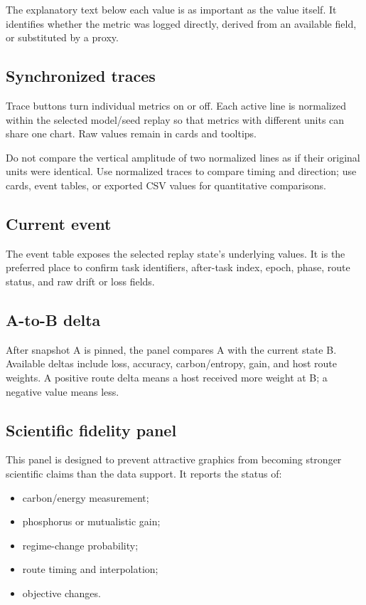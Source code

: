 \documentclass[11pt,a4paper]{article}
\begin{document}
The explanatory text below each value is as important as the value itself. It identifies whether the metric was logged directly, derived from an available field, or substituted by a proxy.

\subsection{Synchronized traces}

Trace buttons turn individual metrics on or off. Each active line is normalized within the selected model/seed replay so that metrics with different units can share one chart. Raw values remain in cards and tooltips.

\begin{warningbox}
Do not compare the vertical amplitude of two normalized lines as if their original units were identical. Use normalized traces to compare timing and direction; use cards, event tables, or exported CSV values for quantitative comparisons.
\end{warningbox}

\subsection{Current event}

The event table exposes the selected replay state's underlying values. It is the preferred place to confirm task identifiers, after-task index, epoch, phase, route status, and raw drift or loss fields.

\subsection{A-to-B delta}

After snapshot A is pinned, the panel compares A with the current state B. Available deltas include loss, accuracy, carbon/entropy, gain, and host route weights. A positive route delta means a host received more weight at B; a negative value means less.

\subsection{Scientific fidelity panel}

This panel is designed to prevent attractive graphics from becoming stronger scientific claims than the data support. It reports the status of:

\begin{itemize}
  \item carbon/energy measurement;
  \item phosphorus or mutualistic gain;
  \item regime-change probability;
  \item route timing and interpolation;
  \item objective changes.
\end{itemize}
\end{document}
